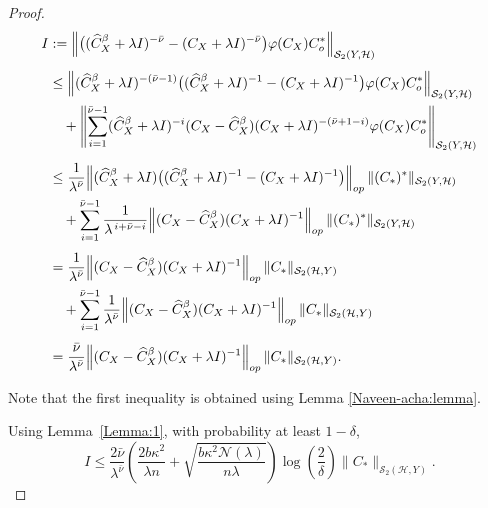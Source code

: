 \documentclass[twoside,11pt]{article}
\begin{document}
\begin{proof}
\begin{align*}
I
&:= \Bigl\| \bigl( (\widehat{C}^\beta_{X}+\lambda I)^{-\bar \nu}
      - (C_X+\lambda I)^{-\bar \nu} \bigr)
      \varphi(C_X)C_o^{*} \Bigr\|_{\mathcal S_2(Y,\mathcal H)}
      \nonumber\\[0.4em]
&\le
\Bigl\| (\widehat{C}^\beta_{X}+\lambda I)^{-(\bar \nu-1)}
       \bigl( (\widehat{C}^\beta_{X}+\lambda I)^{-1}
       - (C_X+\lambda I)^{-1} \bigr)
       \varphi(C_X)C_o^{*}
\Bigr\|_{\mathcal S_2(Y,\mathcal H)}
\nonumber\\
&\quad
+ \Biggl\|
\sum_{i=1}^{\bar \nu-1}
(\widehat{C}^\beta_{X}+\lambda I)^{-i}
(C_X-\widehat{C}^\beta_{X})
(C_X+\lambda I)^{-(\bar \nu+1-i)}
\varphi(C_X)C_o^{*}
\Biggr\|_{\mathcal S_2(Y,\mathcal H)}
\nonumber\\[0.5em]
&\le
\frac{1}{\lambda^{\bar \nu}}
\Bigl\|
(\widehat{C}^\beta_{X}+\lambda I)\bigl( (\widehat{C}^\beta_{X}+\lambda I)^{-1}
       - (C_X+\lambda I)^{-1} \bigr)\Bigr\|_{{op}}
\,
\|(C_{*})^*\|_{\mathcal S_2(Y,\mathcal H)}
\nonumber\\
&\quad
+ \sum_{i=1}^{\bar \nu-1}
\frac{1}{\lambda^{\,i+\bar \nu-i}}
\Bigl\|
(C_X-\widehat{C}^\beta_{X})(C_X+\lambda I)^{-1}
\Bigr\|_{{op}}
\,
\|(C_{*})^*\|_{\mathcal S_2(Y,\mathcal H)}
\nonumber\\[0.4em]
&=
\frac{1}{\lambda^{\bar \nu}}
\Bigl\|
(C_X-\widehat{C}^\beta_{X})(C_X+\lambda I)^{-1}
\Bigr\|_{{op}}
\,
\|C_{*}\|_{\mathcal S_2(\mathcal H,Y)}
\nonumber
\\
&\quad
+ \sum_{i=1}^{\bar \nu-1}
\frac{1}{\lambda^{\bar \nu}}
\Bigl\|
(C_X-\widehat{C}^\beta_{X})(C_X+\lambda I)^{-1}
\Bigr\|_{{op}}
\,
\|C_{*}\|_{\mathcal S_2(\mathcal H,Y)}
\nonumber\\[0.4em]
&=
\frac{\bar \nu}{\lambda^{\bar \nu}}
\Bigl\|
(C_X-\widehat{C}^\beta_{X})(C_X+\lambda I)^{-1}
\Bigr\|_{{op}}
\,
\|C_{*}\|_{\mathcal S_2(\mathcal H,Y)}.
\end{align*}

\noindent
Note that the first inequality is obtained using Lemma \ref{Naveen-acha:lemma}.

\vspace{0.4em}

\noindent
Using Lemma~\ref{Lemma:1}, with probability at least $1-\delta$,
\begin{equation}
I
\le
\frac{2\bar \nu}{\lambda^{\bar \nu}}
\left(
\frac{2b\kappa^2}{\lambda n}
+
\sqrt{\frac{b\kappa^2\mathcal N(\lambda)}{n\lambda}}
\right)
\log\!\left(\frac{2}{\delta}\right)
\|C_{*}\|_{\mathcal S_2(\mathcal H,Y)} .
\end{equation}


\end{proof}
\end{document}

